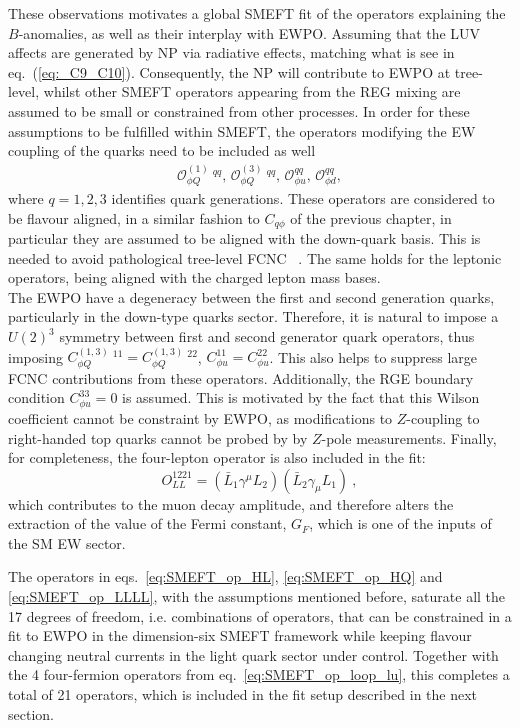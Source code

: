 These observations motivates a global SMEFT fit  of the operators explaining the  $B$-anomalies, as well as their interplay with EWPO.  Assuming that the LUV affects are generated by NP via radiative effects, matching what is see in  eq.~(\ref{eq:_C9_C10}). Consequently, the NP will contribute to EWPO at tree-level, whilst other SMEFT operators appearing from the REG mixing are assumed to be small or constrained from other processes.  In order for these assumptions to be fulfilled within SMEFT, the operators modifying the EW coupling of the quarks need to be included as well 
\begin{eqnarray} 
	\label{eq:SMEFT_op_HQ}
		\mathcal{O}_{\phi Q}^{(1)} \ ^{qq} , \,
		\mathcal{O}_{\phi Q}^{(3)}\ ^{qq} ,\,  
		\mathcal{O}_{\phi u}^{qq}, \, 
		\mathcal{O}_{\phi d}^{qq}, 
\end{eqnarray}
where $q=1,2,3$ identifies quark generations. These operators are considered to be flavour aligned, in a similar fashion to $C_{q\phi}$ of the previous chapter, in particular they are assumed to be aligned with the down-quark basis. This is needed to avoid pathological tree-level FCNC ~\cite{Silvestrini:2018dos}. The same holds for the leptonic operators, being aligned with the charged lepton mass bases.\\
%
The EWPO have a degeneracy between the first and second generation quarks, particularly in the down-type quarks sector. Therefore, it is natural to impose a $U(2)^3$ symmetry between first and second generator quark operators, thus imposing $C_{\phi Q}^{(1,3)}\ ^{11} = C_{\phi Q}^{(1,3)}\ ^{22} $, $C_{\phi u}^{11} = C_{\phi u}^{22}$. This also helps to suppress large FCNC contributions from these operators.  Additionally, the RGE boundary condition $C^{33}_{\phi u}=0$ is assumed. This is motivated by the fact that this Wilson coefficient cannot be constraint by EWPO, as modifications to $Z$-coupling to right-handed top quarks cannot be probed by by $Z$-pole measurements. 
Finally, for completeness, the four-lepton operator is also included in the fit:
\begin{equation}
	\label{eq:SMEFT_op_LLLL}
	O^{1221}_{LL}=(\bar{L}_1 \gamma^\mu L_2) (\bar{L}_2 \gamma_\mu L_1) \ ,
\end{equation}
which contributes to the muon decay amplitude, and therefore alters the extraction of the value of the Fermi constant, $G_F$, which is one of the inputs of the SM EW sector.

The operators in eqs.~\eqref{eq:SMEFT_op_HL}, \eqref{eq:SMEFT_op_HQ} and \eqref{eq:SMEFT_op_LLLL}, with the assumptions mentioned before, saturate all the 17 degrees of freedom, i.e. combinations of operators, that can be constrained in a fit to EWPO in the dimension-six SMEFT framework while keeping flavour changing neutral currents in the light quark sector under control. Together with the 4 four-fermion operators from eq.~\eqref{eq:SMEFT_op_loop_lu}, this completes a total of 21 operators, which is included in the fit setup described in the next section. 
